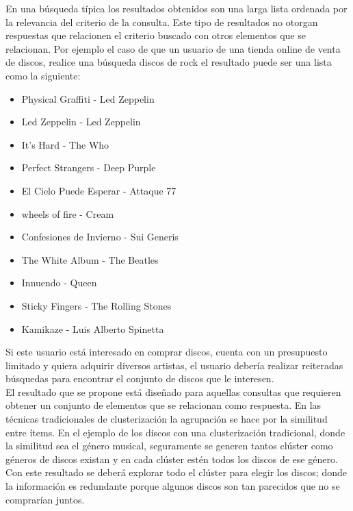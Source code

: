 En una búsqueda típica los resultados obtenidos son una larga lista ordenada por la relevancia del criterio de la consulta. Este tipo de resultados no otorgan respuestas que relacionen el criterio buscado con otros elementos que se relacionan. Por ejemplo el caso de que un usuario de una tienda online de venta de discos, realice una búsqueda discos de rock el resultado puede ser una lista como la siguiente:\\
\begin{itemize}
  \item Physical Graffiti - Led Zeppelin
  \item Led Zeppelin - Led Zeppelin
  \item It's Hard - The Who
  \item Perfect Strangers - Deep Purple
  \item El Cielo Puede Esperar - Attaque 77
  \item wheels of fire - Cream
  \item Confesiones de Invierno - Sui Generis
  \item The White Album - The Beatles
  \item Innuendo - Queen
  \item Sticky Fingers - The Rolling Stones
  \item Kamikaze - Luis Alberto Spinetta
\end{itemize}

Si este usuario está interesado en comprar discos, cuenta con un presupuesto limitado y quiera adquirir diversos artistas, el usuario debería realizar reiteradas búsquedas para encontrar el conjunto de discos que le interesen.\\

El resultado que se propone está diseñado para aquellas consultas que requieren obtener un conjunto de elementos que se relacionan como respuesta. En las técnicas tradicionales de clusterización la agrupación se hace por la similitud entre ítems. En el ejemplo de los discos con una clusterización tradicional, donde la similitud sea el género musical, seguramente se generen tantos clúster como géneros de discos existan y en cada clúster estén todos los discos de ese género. Con este resultado se deberá explorar todo el clúster para elegir los discos; donde la información es redundante porque algunos discos son tan parecidos que no se comprarían juntos.\\

